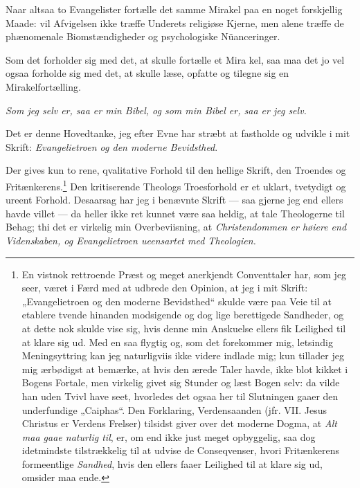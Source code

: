 \documentclass[12pt,a4paper]{book}
\newcommand{\opage}[1]{\marginnote{\footnotesize\textit{[#1]}}}
\begin{document}
Naar altsaa to Evangelister fortælle det samme Mirakel paa en noget forskjellig
Maade: vil Afvigelsen ikke træffe Underets religiøse Kjerne, men alene træffe
de phænomenale Biomstændigheder og psychologiske Nüanceringer.

Som det forholder sig med det, at skulle fortælle et Mira\-%
\opage{51}kel, saa maa det jo vel ogsaa forholde sig med det, at skulle læse, opfatte og
tilegne sig en Mirakelfortælling.

\emph{Som jeg selv er, saa er min Bibel, og som min Bibel er, saa er jeg selv.}

Det er denne Hovedtanke, jeg efter Evne har stræbt at fastholde og udvikle i
mit Skrift: \emph{Evangelietroen og den moderne Bevidsthed}.

Der gives kun to rene, qvalitative Forhold til den hellige Skrift, den Troendes
og Fritænkerens.\footnote{En vistnok rettroende Præst og meget anerkjendt
Conventtaler har, som jeg seer, været i Færd med at udbrede den Opinion, at jeg
i mit Skrift: „Evangelietroen og den moderne Bevidsthed“ skulde være paa Veie
til at etablere tvende hinanden modsigende og dog lige berettigede Sandheder,
og at dette nok skulde vise sig, hvis denne min Anskuelse ellers fik Leilighed
til at klare sig ud. Med en saa flygtig og, som det forekommer mig, letsindig
Meningsyttring kan jeg naturligviis ikke videre indlade mig; kun tillader jeg
mig ærbødigst at bemærke, at hvis den ærede Taler havde, ikke blot kikket i
Bogens Fortale, men virkelig givet sig Stunder og læst Bogen selv: da vilde han
uden Tvivl have seet, hvorledes det ogsaa her til Slutningen gaaer den
underfundige „Caiphas“. Den Forklaring, Verdensaanden (jfr. VII. Jesus Christus
er Verdens Frelser) tilsidst giver over det moderne Dogma, at \emph{Alt maa
gaae naturlig til}, er, om end ikke just meget opbyggelig, saa dog idetmindste
tilstrækkelig til at udvise de Conseqvenser, hvori Fritænkerens formeentlige
\emph{Sandhed}, hvis den ellers faaer Leilighed til at klare sig ud, omsider
maa ende.} Den kritiserende Theologs Troesforhold er et uklart, tvetydigt og
ureent Forhold. Desaarsag har jeg i benævnte Skrift --- saa gjerne jeg end
ellers havde villet --- da heller ikke ret kunnet være saa heldig, at tale
Theologerne til Behag; thi det er virkelig min Overbeviisning, at
\emph{Christendommen er høiere end Videnskaben, og Evangelietroen ueensartet
med Theologien.}

\end{document}
